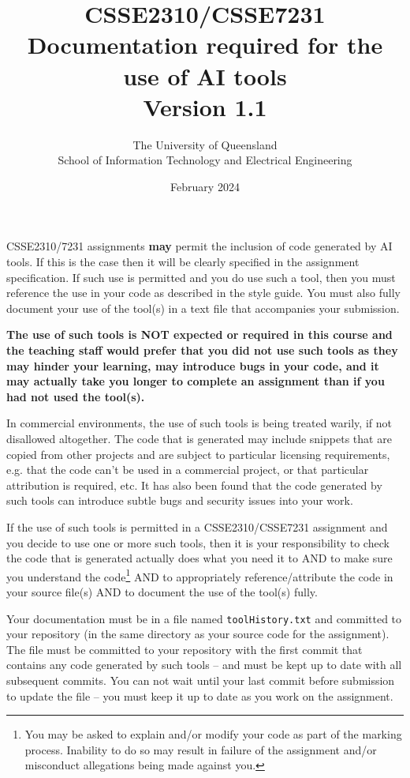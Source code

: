 \documentclass{article}
\title{CSSE2310/CSSE7231\\Documentation required for the use of AI tools\\Version 1.1}
\author{The University of Queensland\\School of Information Technology and Electrical Engineering}
\date{February 2024}
\begin{document}
\maketitle
\thispagestyle{plain}
\linenumbers

CSSE2310/7231 assignments \textbf{may} permit the inclusion of code generated by AI tools. If this is the case
then it will be clearly specified in the assignment specification. If such use is permitted and you do use such a tool, 
then you must reference the use in your code as described in the style guide. You must also fully document your use 
of the tool(s) in a text file that accompanies your submission.

\textbf{The use of such tools is NOT expected or required in this course and the teaching staff would prefer that you did
not use such tools as they may hinder your learning, may introduce bugs in your code, and it may actually take
you longer to complete an assignment than if you had not used the tool(s).}

In commercial environments, the use of such tools is being treated warily, if not disallowed altogether. The code that 
is generated may include snippets that are copied from other projects and are subject to particular licensing requirements, 
e.g. that the code can't be used in a commercial project, or that particular attribution is required, etc. It has also been found 
that the code generated by such tools can introduce subtle bugs and security issues into your work. 

If the use of such tools is permitted in a CSSE2310/CSSE7231 assignment and you decide to use one or more such tools, then it is your responsibility
to check the code that is generated actually does what you need it to AND to make sure you understand the code\footnote{You may be asked to explain and/or 
modify your code as part of the marking process. Inability to do so may result in failure of the assignment and/or misconduct 
allegations being made against you.} AND to appropriately reference/attribute the code in your source file(s) 
AND to document the use of the tool(s) fully.

Your documentation must be in a file named \texttt{toolHistory.txt} and committed to your repository (in the same directory as your 
source code for the assignment). The file must be committed to your repository with the first commit that contains any code generated
by such tools -- and must be kept up to date with all subsequent commits. You can not wait until your last commit before submission
to update the file -- you must keep it up to date as you work on the assignment.
\end{document}
